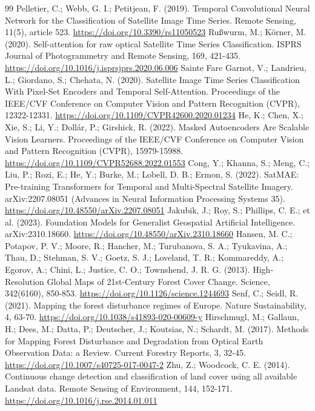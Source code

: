 \documentclass[11pt,a4paper]{article}
\begin{document}
\begin{thebibliography}{99}
 Pelletier, C.; Webb, G. I.; Petitjean, F. (2019). Temporal Convolutional Neural Network for the Classification of Satellite Image Time Series. Remote Sensing, 11(5), article 523. \url{https://doi.org/10.3390/rs11050523}
 Rußwurm, M.; Körner, M. (2020). Self-attention for raw optical Satellite Time Series Classification. ISPRS Journal of Photogrammetry and Remote Sensing, 169, 421-435. \url{https://doi.org/10.1016/j.isprsjprs.2020.06.006}
 Sainte Fare Garnot, V.; Landrieu, L.; Giordano, S.; Chehata, N. (2020). Satellite Image Time Series Classification With Pixel-Set Encoders and Temporal Self-Attention. Proceedings of the IEEE/CVF Conference on Computer Vision and Pattern Recognition (CVPR), 12322-12331. \url{https://doi.org/10.1109/CVPR42600.2020.01234}
 He, K.; Chen, X.; Xie, S.; Li, Y.; Dollár, P.; Girshick, R. (2022). Masked Autoencoders Are Scalable Vision Learners. Proceedings of the IEEE/CVF Conference on Computer Vision and Pattern Recognition (CVPR), 15979-15988. \url{https://doi.org/10.1109/CVPR52688.2022.01553}
 Cong, Y.; Khanna, S.; Meng, C.; Liu, P.; Rozi, E.; He, Y.; Burke, M.; Lobell, D. B.; Ermon, S. (2022). SatMAE: Pre-training Transformers for Temporal and Multi-Spectral Satellite Imagery. arXiv:2207.08051 (Advances in Neural Information Processing Systems 35). \url{https://doi.org/10.48550/arXiv.2207.08051}
 Jakubik, J.; Roy, S.; Phillips, C. E.; et al. (2023). Foundation Models for Generalist Geospatial Artificial Intelligence. arXiv:2310.18660. \url{https://doi.org/10.48550/arXiv.2310.18660}
 Hansen, M. C.; Potapov, P. V.; Moore, R.; Hancher, M.; Turubanova, S. A.; Tyukavina, A.; Thau, D.; Stehman, S. V.; Goetz, S. J.; Loveland, T. R.; Kommareddy, A.; Egorov, A.; Chini, L.; Justice, C. O.; Townshend, J. R. G. (2013). High-Resolution Global Maps of 21st-Century Forest Cover Change. Science, 342(6160), 850-853. \url{https://doi.org/10.1126/science.1244693}
 Senf, C.; Seidl, R. (2021). Mapping the forest disturbance regimes of Europe. Nature Sustainability, 4, 63-70. \url{https://doi.org/10.1038/s41893-020-00609-y}
 Hirschmugl, M.; Gallaun, H.; Dees, M.; Datta, P.; Deutscher, J.; Koutsias, N.; Schardt, M. (2017). Methods for Mapping Forest Disturbance and Degradation from Optical Earth Observation Data: a Review. Current Forestry Reports, 3, 32-45. \url{https://doi.org/10.1007/s40725-017-0047-2}
 Zhu, Z.; Woodcock, C. E. (2014). Continuous change detection and classification of land cover using all available Landsat data. Remote Sensing of Environment, 144, 152-171. \url{https://doi.org/10.1016/j.rse.2014.01.011}

\end{thebibliography}
\end{document}
